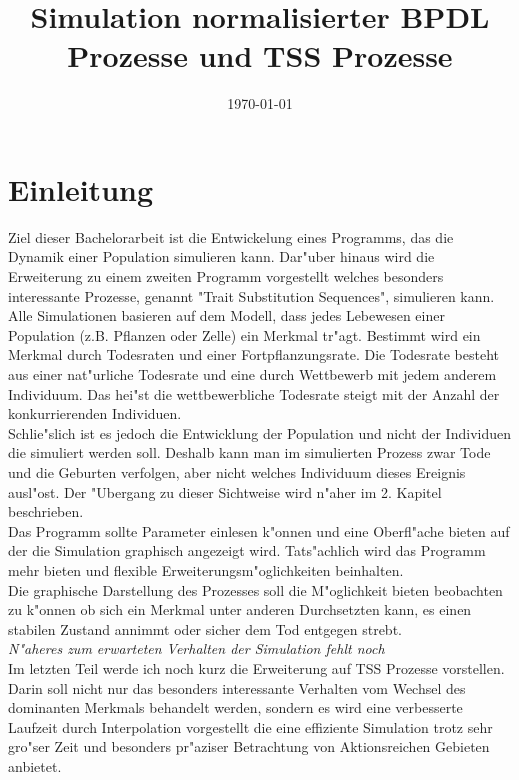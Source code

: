 \documentclass[11pt, a4paper, german]{article}
\date{\today}
\title{Simulation normalisierter BPDL Prozesse und TSS Prozesse}
\theoremstyle{plain}
\begin{document}
\maketitle
\setcounter{tocdepth}{2}
\tableofcontents


\clearpage
\section{Einleitung}
Ziel dieser Bachelorarbeit ist die Entwickelung eines Programms, das die Dynamik einer Population simulieren kann. Dar"uber hinaus wird die Erweiterung zu einem zweiten Programm vorgestellt welches besonders interessante Prozesse, genannt "{}Trait Substitution Sequences"{}, simulieren kann.\\

Alle Simulationen basieren auf dem Modell, dass jedes Lebewesen einer Population (z.B. Pflanzen oder Zelle) ein Merkmal tr"agt. Bestimmt wird ein Merkmal durch Todesraten und einer Fortpflanzungsrate. Die Todesrate besteht aus einer nat"urliche Todesrate und eine durch Wettbewerb mit jedem anderem Individuum. Das hei"st die wettbewerbliche Todesrate steigt mit der Anzahl der konkurrierenden Individuen.\\
Schlie"slich ist es jedoch die Entwicklung der Population und nicht der Individuen die simuliert werden soll. Deshalb kann man im simulierten Prozess zwar Tode und die Geburten verfolgen, aber nicht welches Individuum dieses Ereignis ausl"ost. Der "Ubergang zu dieser Sichtweise wird n"aher im 2. Kapitel beschrieben.\\

Das Programm sollte Parameter einlesen k"onnen und eine Oberfl"ache bieten auf der die Simulation graphisch angezeigt wird. Tats"achlich wird das Programm mehr bieten und flexible Erweiterungsm"oglichkeiten beinhalten.\\
Die graphische Darstellung des Prozesses soll die M"oglichkeit bieten beobachten zu k"onnen ob sich ein Merkmal unter anderen Durchsetzten kann, es einen stabilen Zustand annimmt oder sicher dem Tod entgegen strebt.\\
\textit{N"aheres zum erwarteten Verhalten der Simulation fehlt noch}\\

Im letzten Teil werde ich noch kurz die Erweiterung auf TSS Prozesse vorstellen. Darin soll nicht nur das besonders interessante Verhalten vom Wechsel des dominanten Merkmals behandelt werden, sondern es wird eine verbesserte Laufzeit durch Interpolation vorgestellt die eine effiziente Simulation trotz sehr gro"ser Zeit und besonders pr"aziser Betrachtung von Aktionsreichen Gebieten anbietet.
\end{document}
